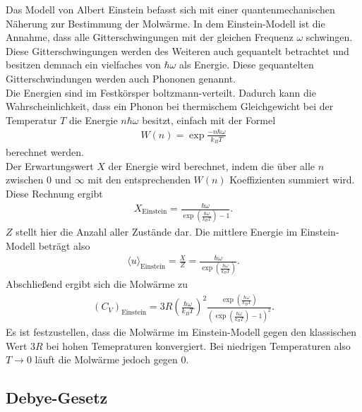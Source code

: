 Das Modell von Albert Einstein befasst sich mit einer quantenmechanischen Näherung zur Bestimmung der Molwärme. In dem Einstein-Modell ist die Annahme, 
dass alle Gitterschwingungen mit der gleichen Frequenz $\omega$ schwingen. Diese Gitterschwingungen werden des Weiteren auch gequantelt betrachtet und besitzen demnach ein 
vielfaches von $\hbar \omega$ als Energie. Diese gequantelten Gitterschwindungen werden auch Phononen genannt. \\

Die Energien sind im Festkörsper boltzmann-verteilt. Dadurch kann die Wahrscheinlichkeit, dass ein Phonon bei thermischem Gleichgewicht bei der Temperatur $T$ die Energie $n \hbar \omega$ besitzt, 
einfach mit der Formel
\begin{align*}
    W(n) = \exp{\frac{-n \hbar \omega}{k_B T}}
\end{align*}
berechnet werden. \\
Der Erwartungswert $X$ der Energie wird berechnet, indem die über alle $n$ zwischen $0$ und $\infty$ mit den entsprechenden $W(n)$ Koeffizienten summiert wird. 
Diese Rechnung ergibt
\begin{align*}
    X_{\text{Einstein}} = \frac{\hbar \omega}{\exp \left( \frac{\hbar \omega}{k_B T}\right) -1} .
\end{align*} 
$Z$ stellt hier die Anzahl aller Zustände dar. Die mittlere Energie im Einstein-Modell beträgt also 
\begin{align*}
    \langle u \rangle_{\text{Einstein}} = \frac{X}{Z} = \frac{\hbar \omega }{\exp \left( \frac{\hbar \omega}{k_B T}\right)}.
\end{align*}
Abschließend ergibt sich die Molwärme zu 
\begin{align}
    \label{eqn:moleinstein}
    (C_V)_{\text{Einstein}} = 3 R \left( \frac{\hbar \omega}{k_B T}\right)^2 \frac{\exp \left(\frac{\hbar \omega}{k_B T}\right)}{\left(\exp \left(\frac{\hbar \omega}{k_B T}\right) -1 \right)^2}.
\end{align}
Es ist festzustellen, dass die Molwärme im Einstein-Modell gegen den klassischen Wert $3 R$ bei hohen Temepraturen konvergiert. Bei niedrigen Temperaturen also $T \rightarrow 0$ läuft die Molwärme jedoch gegen $0$.
\subsection{Debye-Gesetz}
\label{sec:debye}

